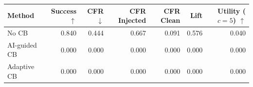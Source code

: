\begin{tabular}{lrrrrrr}
\toprule
Method & Success $\uparrow$ & CFR $\downarrow$ & CFR Injected & CFR Clean & Lift & Utility ($c=5$) $\uparrow$ \\
\midrule
No CB & 0.840 & 0.444 & 0.667 & 0.091 & 0.576 & 0.040 \\
AI-guided CB & 0.000 & 0.000 & 0.000 & 0.000 & 0.000 & 0.000 \\
Adaptive CB & 0.000 & 0.000 & 0.000 & 0.000 & 0.000 & 0.000 \\
\bottomrule
\end{tabular}
